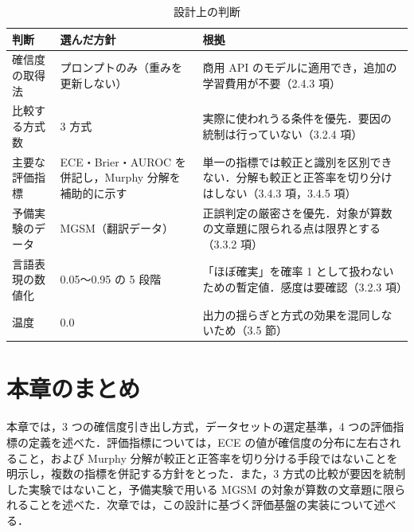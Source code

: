 \begin{table}[htbp]
\centering
\small
\caption{設計上の判断}
\label{tab:3.4}
\begin{tabularx}{\linewidth}{|l|X|X|}
\hline
判断 & 選んだ方針 & 根拠 \\
\hline
確信度の取得法 & プロンプトのみ（重みを更新しない） & 商用 API のモデルに適用でき，追加の学習費用が不要（2.4.3 項） \\
比較する方式数 & 3 方式 & 実際に使われうる条件を優先．要因の統制は行っていない（3.2.4 項） \\
主要な評価指標 & ECE・Brier・AUROC を併記し，Murphy 分解を補助的に示す & 単一の指標では較正と識別を区別できない．分解も較正と正答率を切り分けはしない（3.4.3 項，3.4.5 項） \\
予備実験のデータ & MGSM（翻訳データ） & 正誤判定の厳密さを優先．対象が算数の文章題に限られる点は限界とする（3.3.2 項） \\
言語表現の数値化 & 0.05〜0.95 の 5 段階 & 「ほぼ確実」を確率 1 として扱わないための暫定値．感度は要確認（3.2.3 項） \\
温度 & 0.0 & 出力の揺らぎと方式の効果を混同しないため（3.5 節） \\
\hline
\end{tabularx}
\end{table}

\section{本章のまとめ}

本章では，3 つの確信度引き出し方式，データセットの選定基準，4 つの評価指標の定義を述べた．評価指標については，ECE の値が確信度の分布に左右されること，および Murphy 分解が較正と正答率を切り分ける手段ではないことを明示し，複数の指標を併記する方針をとった．また，3 方式の比較が要因を統制した実験ではないこと，予備実験で用いる MGSM の対象が算数の文章題に限られることを述べた．次章では，この設計に基づく評価基盤の実装について述べる．
